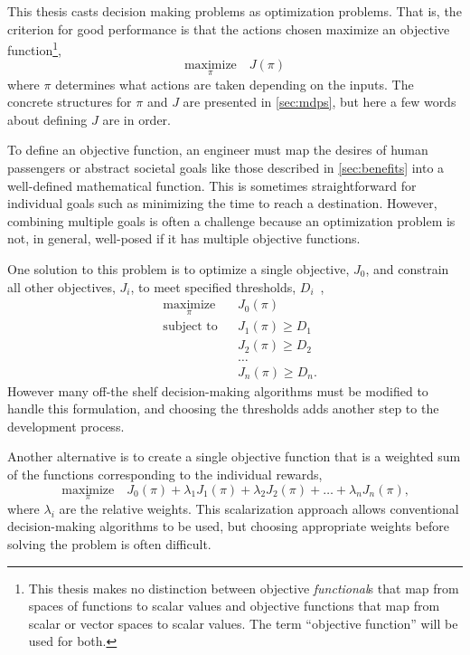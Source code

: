 This thesis casts decision making problems as optimization problems.
That is, the criterion for good performance is that the actions chosen maximize an objective function\footnote{This thesis makes no distinction between objective \emph{functional}s that map from spaces of functions to scalar values and objective functions that map from scalar or vector spaces to scalar values. The term ``objective function'' will be used for both.},
\begin{equation}
\underset{\pi}{\text{maximize}} \quad J(\pi)
\end{equation}
where $\pi$ determines what actions are taken depending on the inputs. The concrete structures for $\pi$ and $J$ are presented in \cref{sec:mdps}, but here a few words about defining $J$ are in order.

To define an objective function, an engineer must map the desires of human passengers or abstract societal goals like those described in \cref{sec:benefits} into a well-defined mathematical function.
This is sometimes straightforward for individual goals such as minimizing the time to reach a destination.
However, combining multiple goals is often a challenge because an optimization problem is not, in general, well-posed if it has multiple objective functions.

One solution to this problem is to optimize a single objective, $J_0$, and constrain all other objectives, $J_i$, to meet specified thresholds, $D_i$~\cite{EA:99},
\begin{equation}
    \begin{aligned}
    & \underset{\pi}{\text{maximize}} & & J_0(\pi) \\
    & \text{subject to} & & J_1(\pi) \geq D_1 \\
    &                   & & J_2(\pi) \geq D_2 \\
    &                   & & \ldots \\
    &                   & & J_n(\pi) \geq D_n \text{.}
    \end{aligned}
\end{equation}
However many off-the shelf decision-making algorithms must be modified to handle this formulation, and choosing the thresholds adds another step to the development process.

Another alternative is to create a single objective function that is a weighted sum of the functions corresponding to the individual rewards,
\begin{equation}
    \underset{\pi}{\text{maximize}} \quad J_0(\pi) + \lambda_1 J_1(\pi) + \lambda_2 J_2(\pi) + \ldots + \lambda_n J_n(\pi) \text{,}
\end{equation}
where $\lambda_i$ are the relative weights.
This scalarization approach allows conventional decision-making algorithms to be used, but choosing appropriate weights before solving the problem is often difficult.


